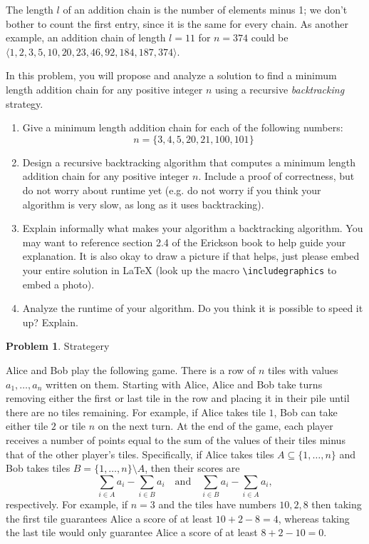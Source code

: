 \documentclass[11pt]{article}
\theoremstyle{definition}
\theoremstyle{theorem}
\newtheorem{prob}{Problem}
\newcommand{\solution}{\medskip\noindent{\color{DarkBlue}\textbf{Solution:}}}
\begin{document}
The length $l$ of an addition chain is the number of elements minus 1; we don’t bother to count the first entry, since it is the same for every chain. As another example, an addition chain of length $l=11$ for $n=374$ could be $\langle 1,2,3,5,10,20,23,46,92,184,187,374\rangle$.

In this problem, you will propose and analyze a solution to find a minimum length addition chain for any positive integer $n$ using a recursive \emph{backtracking} strategy. 

\begin{enumerate}[label=(\alph*)]
	\item Give a minimum length addition chain for each of the following numbers: $$n=\{3, 4, 5, 20, 21, 100, 101\}$$
	
	\solution
	
	\item Design a recursive backtracking algorithm that computes a minimum length addition chain for any positive integer $n$. Include a proof of correctness, but do not worry about runtime yet (e.g. do not worry if you think your algorithm is very slow, as long as it uses backtracking).
	
	\solution
	
	\item Explain informally what makes your algorithm a backtracking algorithm. You may want to reference section 2.4 of the Erickson book to help guide your explanation. It is also okay to draw a picture if that helps, just please embed your entire solution in LaTeX (look up the macro \lstinline!\includegraphics! to embed a photo). 

	\solution	
	
	\item Analyze the runtime of your algorithm. Do you think it is possible to speed it up? Explain.

	\solution
	
	
\end{enumerate}


\newpage
\begin{prob}Strategery\end{prob}

Alice and Bob play the following game.  There is a row of $n$ tiles with values $a_1,\dots,a_n$ written on them.  Starting with Alice, Alice and Bob take turns removing either the first or last tile in the row and placing it in their pile until there are no tiles remaining.  For example, if Alice takes tile $1$, Bob can take either tile $2$ or tile $n$ on the next turn.  At the end of the game, each player receives a number of points equal to the sum of the values of their tiles minus that of the other player's tiles.  Specifically, if Alice takes tiles $A \subseteq \{1,\dots,n\}$ and Bob takes tiles $B = \{1,\dots,n\} \setminus A$, then their scores are
$$
\sum_{i \in A} a_i - \sum_{i \in B} a_i \quad \textrm{and} \quad \sum_{i \in B} a_i - \sum_{i \in A} a_i,
$$
respectively.  For example, if $n = 3$ and the tiles have numbers $10, 2, 8$ then taking the first tile guarantees Alice a score of at least $10 + 2 - 8 = 4$, whereas taking the last tile would only guarantee Alice a score of at least $8 + 2 - 10 = 0$.
\end{document}

